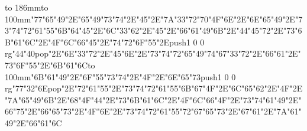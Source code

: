 \hbox to 186mm{\hsize=81mm\vbox to 100mm{\vfill\ipa\char"77\ipa\char"65\ipa\char"49\ipa\char"2E\ipa\char"65\ipa\char"49\ipa\char"73\ipa\char"74\ipa\char"2E\ipa\char"45\ipa\char"2E\ipa\char"7A\ipa\char"33\ipa\char"72\medskip\ipa\char"70\ipa\char"4F\ipa\char"6E\ipa\char"2E\ipa\char"6E\ipa\char"65\ipa\char"49\ipa\char"2E\ipa\char"73\ipa\char"74\ipa\char"72\ipa\char"61\ipa\char"55\ipa\char"6B\medskip\ipa\char"64\ipa\char"45\ipa\char"2E\ipa\char"6C\ipa\char"33\ipa\char"62\ipa\char"2E\ipa\char"45\ipa\char"2E\ipa\char"66\ipa\char"61\ipa\char"49\ipa\char"6B\ipa\char"2E\ipa\char"44\ipa\char"45\ipa\char"72\ipa\char"2E\ipa\char"73\ipa\char"6B\ipa\char"61\ipa\char"6C\ipa\char"2E\ipa\char"4F\ipa\char"6C\ipa\char"66\medskip\ipa\char"45\ipa\char"2E\ipa\char"74\ipa\char"72\ipa\char"6F\ipa\char"55\ipa\char"2E\pdfcolorstack\match push{1 0 0 rg}\ipa\char"44\ipa\char"40\pdfcolorstack\match pop{}\ipa\char"2E\ipa\char"6E\ipa\char"33\ipa\char"72\ipa\char"2E\ipa\char"45\ipa\char"6E\ipa\char"2E\ipa\char"73\ipa\char"74\ipa\char"72\ipa\char"65\ipa\char"49\ipa\char"74\medskip\ipa\char"67\ipa\char"33\ipa\char"72\ipa\char"2E\ipa\char"66\ipa\char"61\ipa\char"2E\ipa\char"73\ipa\char"6F\ipa\char"55\ipa\char"2E\ipa\char"6B\ipa\char"61\ipa\char"6C\vfill}\hfill\vbox to 100mm{\vfill\ipa\char"6B\ipa\char"61\ipa\char"49\ipa\char"2E\ipa\char"6F\ipa\char"55\ipa\char"73\ipa\char"74\ipa\char"2E\ipa\char"4F\ipa\char"2E\ipa\char"6E\ipa\char"65\ipa\char"73\medskip\pdfcolorstack\match push{1 0 0 rg}\ipa\char"77\ipa\char"32\ipa\char"6E\pdfcolorstack\match pop{}\ipa\char"2E\ipa\char"72\ipa\char"61\ipa\char"55\ipa\char"2E\ipa\char"73\ipa\char"74\ipa\char"72\ipa\char"61\ipa\char"55\ipa\char"6B\medskip\ipa\char"67\ipa\char"4F\ipa\char"2E\ipa\char"6C\ipa\char"65\ipa\char"62\ipa\char"2E\ipa\char"4F\ipa\char"2E\ipa\char"7A\ipa\char"65\ipa\char"49\ipa\char"6B\ipa\char"2E\ipa\char"68\ipa\char"4F\ipa\char"44\ipa\char"2E\ipa\char"73\ipa\char"6B\ipa\char"61\ipa\char"6C\ipa\char"2E\ipa\char"4F\ipa\char"6C\ipa\char"66\medskip\ipa\char"4F\ipa\char"2E\ipa\char"73\ipa\char"74\ipa\char"61\ipa\char"49\ipa\char"2E\ipa\char"66\ipa\char"75\ipa\char"2E\ipa\char"66\ipa\char"65\ipa\char"73\ipa\char"2E\ipa\char"4F\ipa\char"6E\ipa\char"2E\ipa\char"73\ipa\char"74\ipa\char"72\ipa\char"61\ipa\char"55\ipa\char"72\medskip\ipa\char"67\ipa\char"65\ipa\char"73\ipa\char"2E\ipa\char"67\ipa\char"61\ipa\char"2E\ipa\char"7A\ipa\char"61\ipa\char"49\ipa\char"2E\ipa\char"66\ipa\char"61\ipa\char"6C\vfill}}\eject
